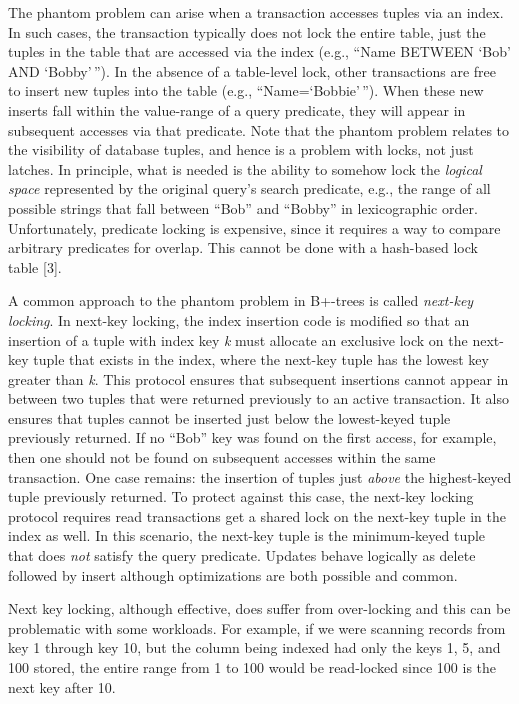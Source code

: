\documentclass[a4paper,11pt,twoside,openright]{book}
\begin{document}
The phantom problem can arise when a transaction accesses tuples via an
index. In such cases, the transaction typically does not lock the entire
table, just the tuples in the table that are accessed via the index
(e.g., ``Name BETWEEN `Bob' AND `Bobby'\,''). In the absence of a
table-level lock, other transactions are free to insert new tuples into
the table (e.g., ``Name=`Bobbie'\,''). When these new inserts fall
within the value-range of a query predicate, they will appear in
subsequent accesses via that predicate. Note that the phantom problem
relates to the visibility of database tuples, and hence is a problem
with locks, not just latches. In principle, what is needed is the
ability to somehow lock the \emph{logical space} represented by the
original query's search predicate, e.g., the range of all possible
strings that fall between ``Bob'' and ``Bobby'' in lexicographic order.
Unfortunately, predicate locking is expensive, since it requires a way
to compare arbitrary predicates for overlap. This cannot be done with a
hash-based lock table {[}3{]}.

A common approach to the phantom problem in B+-trees is called
\emph{next-key locking}. In next-key locking, the index insertion code
is modified so that an insertion of a tuple with index key \emph{k} must
allocate an
exclusive lock on the next-key tuple that exists in the index, where the
next-key tuple has the lowest key greater than \emph{k}. This protocol
ensures that subsequent insertions cannot appear in between two tuples
that were returned previously to an active transaction. It also ensures
that tuples cannot be inserted just below the lowest-keyed tuple
previously returned. If no ``Bob'' key was found on the first access,
for example, then one should not be found on subsequent accesses within
the same transaction. One case remains: the insertion of tuples just
\emph{above} the highest-keyed tuple previously returned. To protect
against this case, the next-key locking protocol requires read
transactions get a shared lock on the next-key tuple in the index as
well. In this scenario, the next-key tuple is the minimum-keyed tuple
that does \emph{not} satisfy the query predicate. Updates behave
logically as delete followed by insert although optimizations are both
possible and common.

Next key locking, although effective, does suffer from over-locking and
this can be problematic with some workloads. For example, if we were
scanning records from key 1 through key 10, but the column being indexed
had only the keys 1, 5, and 100 stored, the entire range from 1 to 100
would be read-locked since 100 is the next key after 10.
\end{document}
